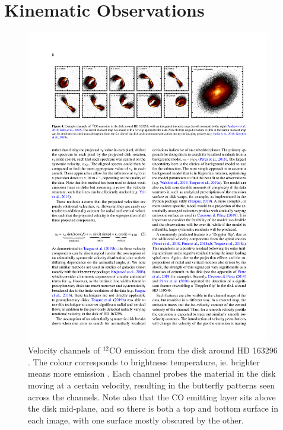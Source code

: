 \section{Kinematic Observations}


\begin{figure}
    \centering
    \includegraphics[width = 0.95\textwidth]{figures/channels.pdf}
    \caption{Velocity channels of $^{12}$CO emission from the disk around HD 163296 \citep{andrews2018}. The colour corresponds to brightness temperature, ie. brighter means more emission \citep{diskdynamicscollaboration2020}. Each channel probes the material in the disk moving at a certain velocity, resulting in the butterfly patterns seen across the channels. Note also that the CO emitting layer sits above the disk mid-plane, and so there is both a top and bottom surface in each image, with one surface mostly obscured by the other.}
    \label{fig:channels}
\end{figure}

